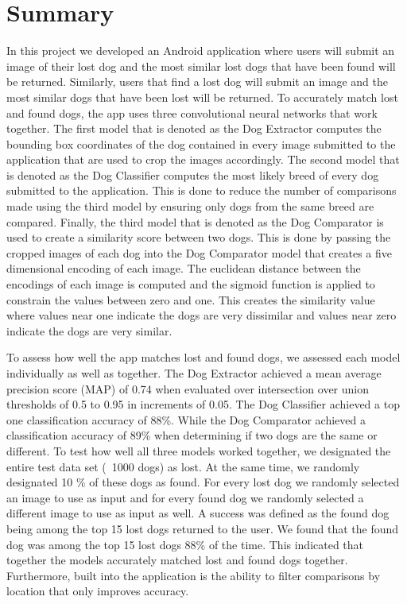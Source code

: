 \documentclass{article}
\begin{document}
\section{Summary}
	In this project we developed an Android application where users will submit an image of their lost dog and the most similar lost dogs that have been found will be returned.  Similarly, users that find a lost dog will submit an image and the most similar dogs that have been lost will be returned.  To accurately match lost and found dogs, the app uses three convolutional neural networks that work together.  The first model that is denoted as the Dog Extractor computes the bounding box coordinates of the dog contained in every image submitted to the application that are used to crop the images accordingly.  The second model that is denoted as the Dog Classifier computes the most likely breed of every dog submitted to the application.  This is done to reduce the number of comparisons made using the third model by ensuring only dogs from the same breed are compared.  Finally, the third model that is denoted as the Dog Comparator is used to create a similarity score between two dogs.  This is done by passing the cropped images of each dog into the Dog Comparator model that creates a five dimensional encoding of each image.  The euclidean distance between the encodings of each image is computed and the sigmoid function is applied to constrain the values between zero and one.  This creates the similarity value where values near one indicate the dogs are very dissimilar and values near zero indicate the dogs are very similar.

	To assess how well the app matches lost and found dogs, we assessed each model individually as well as together.  The Dog Extractor achieved a mean average precision score (MAP) of 0.74 when evaluated over intersection over union thresholds of 0.5 to 0.95 in increments of 0.05.  The Dog Classifier achieved a top one classification accuracy of 88\%.  While the Dog Comparator achieved a classification accuracy of 89\% when determining if two dogs are the same or different.  To test how well all three models worked together, we designated the entire test data set (~1000 dogs) as lost.  At the same time, we randomly designated 10 \% of these dogs as found.  For every lost dog we randomly selected an image to use as input and for every found dog we randomly selected a different image to use as input as well.   A success was defined as the found dog being among the top 15 lost dogs returned to the user.  We found that the found dog was among the top 15 lost dogs 88\% of the time.  This indicated that together the models accurately matched lost and found dogs together.  Furthermore, built into the application is the ability to filter comparisons by location that only improves accuracy.

\newpage



\end{document}
